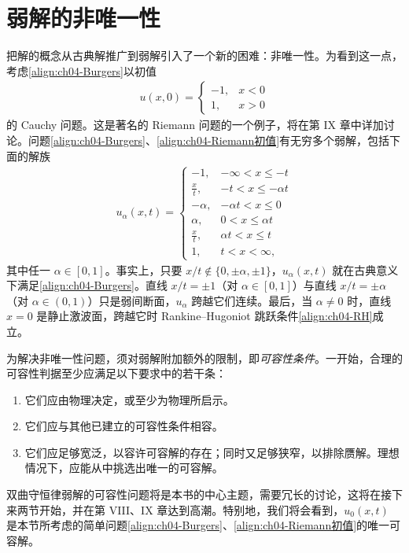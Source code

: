 \documentclass[../../main.tex]{subfiles}
\begin{document}
\section{弱解的非唯一性}\label{section:ch04-弱解的非唯一性}

把解的概念从古典解推广到弱解引入了一个新的困难：非唯一性。为看到这一点，考虑\eqref{align:ch04-Burgers}以初值
\begin{align}
u(x,0)=\begin{cases}-1,&x<0\\ 1,&x>0\end{cases}
\label{align:ch04-Riemann初值}
\end{align}
的 Cauchy 问题。这是著名的 Riemann 问题的一个例子，将在第 IX 章中详加讨论。问题\eqref{align:ch04-Burgers}、\eqref{align:ch04-Riemann初值}有无穷多个弱解，包括下面的解族
\begin{align}
u_{\alpha}(x,t)=
\begin{cases}
-1,&-\infty<x\leqslant-t\\
\frac{x}{t},&-t<x\leqslant-\alpha t\\
-\alpha,&-\alpha t<x\leqslant 0\\
\alpha,&0<x\leqslant\alpha t\\
\frac{x}{t},&\alpha t<x\leqslant t\\
1,&t<x<\infty,
\end{cases}
\label{align:ch04-非唯一解族}
\end{align}
其中任一 $\alpha\in[0,1]$。事实上，只要 $x/t\notin\{0,\pm\alpha,\pm 1\}$，$u_{\alpha}(x,t)$ 就在古典意义下满足\eqref{align:ch04-Burgers}。直线 $x/t=\pm 1$（对 $\alpha\in[0,1]$）与直线 $x/t=\pm\alpha$（对 $\alpha\in(0,1)$）只是弱间断面，$u_{\alpha}$ 跨越它们连续。最后，当 $\alpha\neq 0$ 时，直线 $x=0$ 是静止激波面，跨越它时 Rankine--Hugoniot 跳跃条件\eqref{align:ch04-RH}成立。

为解决非唯一性问题，须对弱解附加额外的限制，即\emph{可容性条件}。一开始，合理的可容性判据至少应满足以下要求中的若干条：
\begin{enumerate}
\item\label{item:ch04-可容-a} 它们应由物理决定，或至少为物理所启示。
\item\label{item:ch04-可容-b} 它们应与其他已建立的可容性条件相容。
\item\label{item:ch04-可容-c} 它们应足够宽泛，以容许可容解的存在；同时又足够狭窄，以排除赝解。理想情况下，应能从中挑选出唯一的可容解。
\end{enumerate}

双曲守恒律弱解的可容性问题将是本书的中心主题，需要冗长的讨论，这将在接下来两节开始，并在第 VIII、IX 章达到高潮。特别地，我们将会看到，$u_{0}(x,t)$ 是本节所考虑的简单问题\eqref{align:ch04-Burgers}、\eqref{align:ch04-Riemann初值}的唯一可容解。
\end{document}
